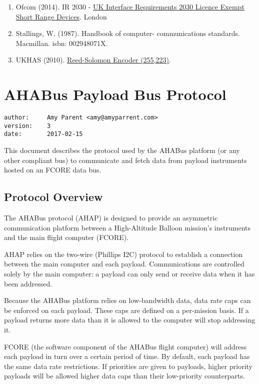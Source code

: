 \begin{appendices}
\begin{enumerate}
\def\labelenumi{\arabic{enumi}.}
\item
  Ofcom (2014). IR 2030 -
  \href{https://www.ofcom.org.uk/__data/assets/pdf_file/0028/84970/ir_2030-june2014.pdf}{UK
  Interface Requirements 2030 Licence Exempt Short Range Devices}.
  London
\item
  Stallings, W. (1987). Handbook of computer- communications standards.
  Macmillan. isbn: 002948071X.
\item
  UKHAS (2010). \href{http://ukhas.org.uk/code:rs8encode}{Reed-Solomon
  Encoder (255,223)}.
\end{enumerate}

\chapter{AHABus Payload Bus Protocol}\label{apx:protocol-bus}

\begin{verbatim}
author:     Amy Parent <amy@amyparrent.com>
version:    3
date:       2017-02-15
\end{verbatim}

This document describes the protocol used by the AHABus platform (or any
other compliant bus) to communicate and fetch data from payload
instruments hosted on an FCORE data bus.

\section{Protocol Overview}\label{protocol-overview}

The AHABus protocol (AHAP) is designed to provide an asymmetric
communication platform between a High-Altitude Balloon mission's
instruments and the main flight computer (FCORE).

AHAP relies on the two-wire (Phillips I2C) protocol to establish a
connection between the main computer and each payload. Communications
are controlled solely by the main computer: a payload can only send or
receive data when it has been addressed.

Because the AHABus platform relies on low-bandwidth data, data rate caps
can be enforced on each payload. These caps are defined on a per-mission
basis. If a payload returns more data than it is allowed to the computer
will stop addressing it.

FCORE (the software component of the AHABus flight computer) will
address each payload in turn over a certain period of time. By default,
each payload has the same data rate restrictions. If priorities are
given to payloads, higher priority payloads will be allowed higher data
caps than their low-priority counterparts.


\end{appendices}
